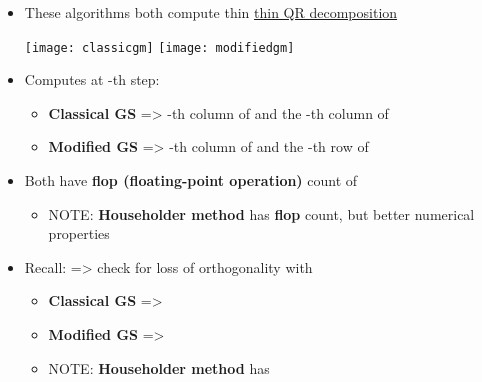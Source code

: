 \begin{itemize}

      \item
            These algorithms both compute thin \underline{thin QR decomposition}

            \texttt{[image: classicgm]}
            \texttt{[image: modifiedgm]}
      \item
            Computes at -th step:

            \begin{itemize}

                  \item
                        \textbf{Classical GS} => -th column of
                         and the -th column of 
                  \item
                        \textbf{Modified GS} => -th column of
                         and the -th row of 
            \end{itemize}
      \item
            Both have \textbf{flop (floating-point operation)} count of

            \begin{itemize}

                  \item
                        NOTE: \textbf{Householder method} has
                         \textbf{flop} count,
                        but better numerical properties
            \end{itemize}
      \item
            Recall:  =>
            check for loss of orthogonality with

            \begin{itemize}

                  \item
                        \textbf{Classical GS} =>
                  \item
                        \textbf{Modified GS} =>
                  \item
                        NOTE: \textbf{Householder method} has
            \end{itemize}
\end{itemize}

